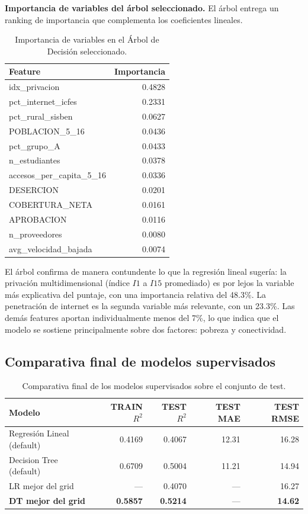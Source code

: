 \textbf{Importancia de variables del árbol seleccionado.} El árbol entrega un ranking de importancia que complementa los coeficientes lineales.

\begin{table}[H]
\centering
\caption{Importancia de variables en el Árbol de Decisión seleccionado.}
\begin{tabular}{l r}
\toprule
\textbf{Feature} & \textbf{Importancia} \\
\midrule
idx\_privacion              & 0.4828 \\
pct\_internet\_icfes         & 0.2331 \\
pct\_rural\_sisben           & 0.0627 \\
POBLACION\_5\_16             & 0.0436 \\
pct\_grupo\_A                & 0.0433 \\
n\_estudiantes               & 0.0378 \\
accesos\_per\_capita\_5\_16  & 0.0336 \\
DESERCION                    & 0.0201 \\
COBERTURA\_NETA              & 0.0161 \\
APROBACION                   & 0.0116 \\
n\_proveedores               & 0.0080 \\
avg\_velocidad\_bajada       & 0.0074 \\
\bottomrule
\end{tabular}
\end{table}

El árbol confirma de manera contundente lo que la regresión lineal sugería: la privación multidimensional (índice $I1$ a $I15$ promediado) es por lejos la variable más explicativa del puntaje, con una importancia relativa del 48.3\%. La penetración de internet es la segunda variable más relevante, con un 23.3\%. Las demás features aportan individualmente menos del 7\%, lo que indica que el modelo se sostiene principalmente sobre dos factores: pobreza y conectividad.

\subsection{Comparativa final de modelos supervisados}
\begin{table}[H]
\centering
\caption{Comparativa final de los modelos supervisados sobre el conjunto de test.}
\begin{tabular}{l r r r r}
\toprule
\textbf{Modelo} & \textbf{TRAIN $R^2$} & \textbf{TEST $R^2$} & \textbf{TEST MAE} & \textbf{TEST RMSE} \\
\midrule
Regresión Lineal (default)       & 0.4169 & 0.4067 & 12.31 & 16.28 \\
Decision Tree (default)          & 0.6709 & 0.5004 & 11.21 & 14.94 \\
LR mejor del grid                & ---    & 0.4070 & ---   & 16.27 \\
\textbf{DT mejor del grid}       & \textbf{0.5857} & \textbf{0.5214} & ---  & \textbf{14.62} \\
\bottomrule
\end{tabular}
\end{table}

